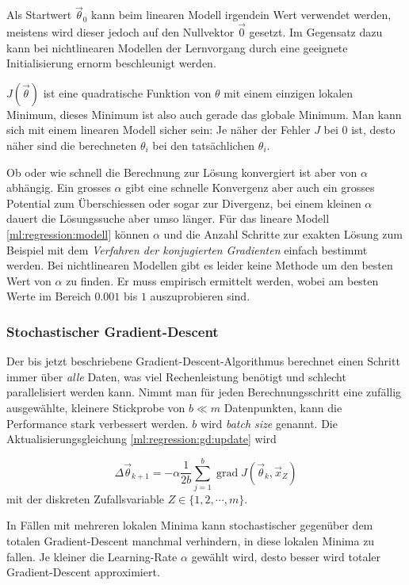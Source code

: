 Als Startwert $\vec\theta_0$ kann beim linearen Modell irgendein Wert verwendet werden, meistens wird dieser jedoch
auf den Nullvektor $\vec 0$ gesetzt. Im Gegensatz dazu kann bei nichtlinearen Modellen der Lernvorgang
durch eine geeignete Initialisierung ernorm beschleunigt werden.

$J(\vec \theta)$ ist eine quadratische Funktion von $\theta$ mit einem einzigen lokalen
Minimum, %
dieses Minimum ist also auch gerade das globale Minimum. Man kann sich mit einem linearen
Modell sicher sein: Je näher der Fehler $J$ bei $0$ ist, desto näher sind die berechneten
$\theta_i$ bei den tatsächlichen $\theta_i$.

Ob oder wie schnell die Berechnung zur Lösung konvergiert ist aber von $\alpha$ abhängig.
Ein grosses $\alpha$ gibt eine schnelle Konvergenz aber auch ein grosses Potential zum
Überschiessen oder sogar zur Divergenz, bei einem kleinen $\alpha$ dauert die Lösungssuche
aber umso länger.
Für das lineare Modell \eqref{ml:regression:modell} können $\alpha$ und die Anzahl Schritte
zur exakten Lösung zum Beispiel mit dem \emph{Verfahren der konjugierten Gradienten}
einfach bestimmt werden.
Bei nichtlinearen Modellen gibt es leider keine Methode um den besten Wert von
$\alpha$ zu finden. Er muss empirisch ermittelt werden, wobei am besten Werte im Bereich
$0.001$ bis $1$ auszuprobieren sind. \cite[S. 51]{ml:introduction-to-ml}


\subsubsection{Stochastischer Gradient-Descent}

Der bis jetzt beschriebene Gradient-Descent-Algorithmus berechnet einen Schritt immer über
\emph{alle} Daten, was viel Rechenleistung benötigt und schlecht parallelisiert werden
kann.
Nimmt man für jeden Berechnungsschritt eine zufällig ausgewählte, kleinere Stickprobe von
$b \ll m$ Datenpunkten, kann die Performance stark verbessert werden. $b$ wird
\emph{batch size} genannt. Die Aktualisierungsgleichung \eqref{ml:regression:gd:update} wird

\begin{equation}
  \Delta \vec\theta_{k+1} = - \alpha \frac{1}{2b} \sum_{j=1}^{b} \operatorname{grad} J(\vec
  \theta_k, \vec x_Z)
\end{equation}
mit der diskreten Zufallsvariable $Z \in \{1, 2,\cdots, m\}$.

In Fällen mit mehreren lokalen Minima kann stochastischer gegenüber dem totalen Gradient-Descent manchmal
verhindern, in diese lokalen Minima zu fallen. Je kleiner die Learning-Rate $\alpha$ gewählt
wird, desto besser wird totaler Gradient-Descent approximiert. 
\cite[S. 93ff]{ml:ml-tom-mitchell}

